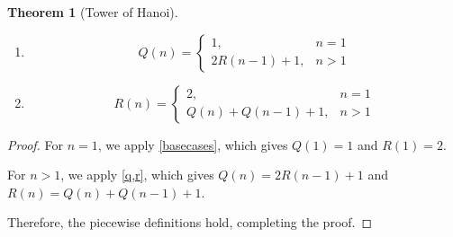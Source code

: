 \documentclass[12pt]{article}
\newtheorem{theorem}{Theorem}[section]
\theoremstyle{definition}
\begin{document}
\begin{theorem}[Tower of Hanoi]
  \leavevmode
  \begin{enumerate}[label=(\arabic*)]
    \item \[
        Q(n) =
        \begin{cases}
          1, & n = 1 \\
          2R(n - 1) + 1, & n > 1
        \end{cases}
      \]
    \item \[
        R(n) =
        \begin{cases}
          2, & n = 1 \\
          Q(n) + Q(n - 1) + 1, & n > 1
        \end{cases}
      \]
  \end{enumerate}
\end{theorem}

\begin{proof}
  For $n = 1$, we apply \cref{basecases}, which gives $Q(1) = 1$ and $R(1) = 2$.

  For $n > 1$, we apply \cref{q,r}, which gives $Q(n) = 2R(n - 1) +
  1$ and $R(n) = Q(n) + Q(n - 1) + 1$.

  Therefore, the piecewise definitions hold, completing the proof.
\end{proof}
\end{document}
